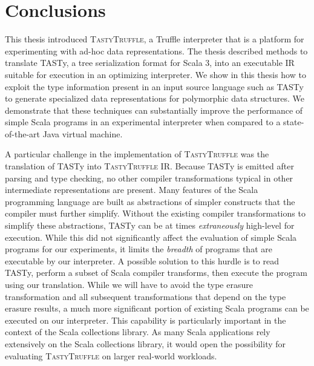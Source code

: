\chapter{Conclusions}

This thesis introduced \textsc{TastyTruffle}, a Truffle interpreter that is a platform for experimenting with ad-hoc data representations.
The thesis described methods to translate TASTy, a tree serialization format for Scala 3, into an executable IR suitable for execution in an optimizing interpreter.
We show in this thesis how to exploit the type information present in an input source language such as TASTy to generate specialized data representations for polymorphic data structures.
We demonstrate that these techniques can substantially improve the performance of simple Scala programs in an experimental interpreter when compared to a state-of-the-art Java virtual machine.

A particular challenge in the implementation of \textsc{TastyTruffle} was the translation of TASTy into \textsc{TastyTruffle} IR.
Because TASTy is emitted after parsing and type checking, no other compiler transformations typical in other intermediate representations are present.
Many features of the Scala programming language are built as abstractions of simpler constructs that the compiler must further simplify.
Without the existing compiler transformations to simplify these abstractions, TASTy can be at times \textit{extraneously} high-level for execution.
While this did not significantly affect the evaluation of simple Scala programs for our experiments, it limits the \textit{breadth} of programs that are executable by our interpreter.
A possible solution to this hurdle is to read TASTy, perform a subset of Scala compiler transforms, then execute the program using our translation.
While we will have to avoid the type erasure transformation and all subsequent transformations that depend on the type erasure results, a much more significant portion of existing Scala programs can be executed on our interpreter. 
This capability is particularly important in the context of the Scala collections library. 
As many Scala applications rely extensively on the Scala collections library, it would open the possibility for evaluating \textsc{TastyTruffle} on larger real-world workloads.

